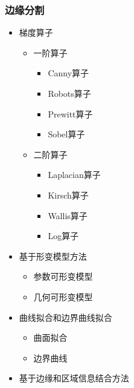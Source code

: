 \documentclass[notheorems,mathserif,table,compress]{beamer}  %
\begin{document}
\begin{frame}
   \frametitle{边缘分割}
   \begin{itemize}
   \item 梯度算子
         \begin{itemize}
         \item 一阶算子
               \begin{itemize}
               \item Canny算子
               \item Robots算子
               \item Prewitt算子
               \item Sobel算子
               \end{itemize}
         \item 二阶算子
               \begin{itemize}
               \item Laplacian算子
               \item Kirsch算子
               \item Wallis算子
               \item Log算子
               \end{itemize}
         \end{itemize}
   \item 基于形变模型方法
         \begin{itemize}
         \item 参数可形变模型
         \item 几何可形变模型
         \end{itemize} 
   \item 曲线拟合和边界曲线拟合
         \begin{itemize}
         \item 曲面拟合
         \item 边界曲线
         \end{itemize} 
   \item 基于边缘和区域信息结合方法        
   \end{itemize}
\end{frame}
\end{document}
